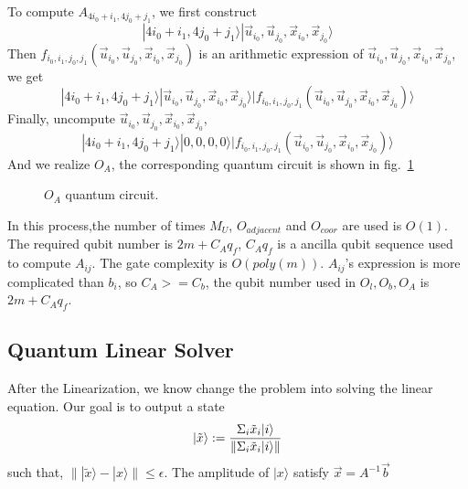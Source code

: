 \documentclass[%
 reprint,
 amsmath,amssymb,
pra,
]{revtex4-1}
\begin{document}
To compute $A_{4i_0+i_1,4j_0+j_1}$, we first construct
$$
|4i_0+i_1,4j_0+j_1\rangle|\vec{u}_{i_0},\vec{u}_{j_0},\vec{x}_{i_0},\vec{x}_{j_0}\rangle
$$
Then $f_{i_0,i_1,j_0,j_1}(\vec{u}_{i_0},\vec{u}_{j_0},\vec{x}_{i_0},\vec{x}_{j_0})$  is an arithmetic expression of $\vec{u}_{i_0},\vec{u}_{j_0},\vec{x}_{i_0},\vec{x}_{j_0}$, we get
$$
|4i_0+i_1,4j_0+j_1\rangle|\vec{u}_{i_0},\vec{u}_{j_0},\vec{x}_{i_0},\vec{x}_{j_0}\rangle|f_{i_0,i_1,j_0,j_1}(\vec{u}_{i_0},\vec{u}_{j_0},\vec{x}_{i_0},\vec{x}_{j_0})\rangle
$$
Finally, uncompute $\vec{u}_{i_0},\vec{u}_{j_0},\vec{x}_{i_0},\vec{x}_{j_0}$,
$$
|4i_0+i_1,4j_0+j_1\rangle|0,0,0,0\rangle|f_{i_0,i_1,j_0,j_1}(\vec{u}_{i_0},\vec{u}_{j_0},\vec{x}_{i_0},\vec{x}_{j_0})\rangle
$$
And we realize $O_A$, the corresponding quantum circuit is shown in fig.~\ref{OA} 
\begin{figure}[htbp]
    \caption{$O_A$ quantum circuit. }
    \label{OA}
\end{figure}
In this process,the number of times $M_U$, $O_{adjacent}$ and $O_{coor}$ are used is $O(1)$. The required qubit number is $2m+C_Aq_f$, $C_Aq_f$ is a ancilla qubit sequence used to compute $A_{ij}$. The gate complexity is $O(poly(m))$. $A_{ij}$'s expression is more complicated than $b_i$, so $C_A>=C_b$, the qubit number used in $O_l,O_b,O_A$ is $2m+C_Aq_f$.



\subsection{Quantum Linear Solver}

After the Linearization, we know change the problem into solving the linear
equation. Our goal is to output a state 
\begin{equation}
|\tilde{x}\rangle:=\frac{\Sigma_i \tilde{x}_i|i\rangle}
{\lVert \Sigma_i \tilde{x}_i |i\rangle\rVert}\notag
\end{equation}
such that, $\lVert |\tilde{x}\rangle-|x\rangle\rVert\leqslant\epsilon$. 
The amplitude of $|x\rangle$ satisfy $\vec{x}=A^{-1}\vec{b}$
\end{document}
